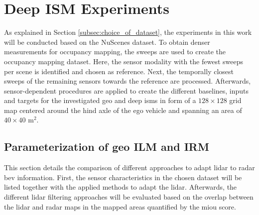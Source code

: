 \chapter{Deep ISM Experiments}
\label{ch:deep_ism_exp}
As explained in Section \ref{subsec:choice_of_dataset}, the experiments in this work will be conducted based on the NuScenes dataset. To obtain denser measurements for occupancy mapping, the sweeps are used to create the occupancy mapping dataset. Here, the sensor modality with the fewest sweeps per scene is identified and chosen as reference. Next, the temporally closest sweeps of the remaining sensors towards the reference are processed. Afterwards, sensor-dependent procedures are applied to create the different baselines, inputs and targets for the investigated geo and deep \gls{ism}s in form of a $128 \times 128$ grid map centered around the hind axle of the ego vehicle and spanning an area of $40 \times 40$ m$^2$.
%
\section{Parameterization of geo ILM and IRM}
\label{sec:choice_of_gt}
This section details the comparison of different approaches to adapt lidar to radar \gls{bev} information. First, the sensor characteristics in the chosen dataset will be listed together with the applied methods to adapt the lidar. Afterwards, the different lidar filtering approaches will be evaluated based on the overlap between the lidar and radar maps in the mapped areas quantified by the m\gls{iou} score. 
%
